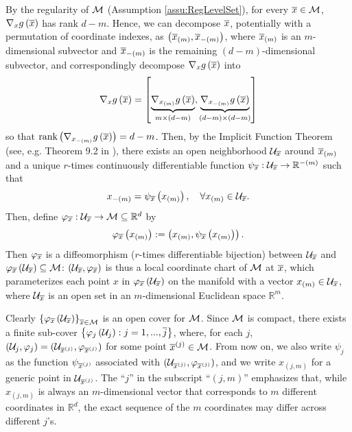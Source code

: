 \documentclass[12pt,american]{article}
\theoremstyle{definition}
\theoremstyle{plain}
\theoremstyle{definition}
\theoremstyle{plain}
\theoremstyle{plain}
\theoremstyle{plain}
\theoremstyle{plain}
\theoremstyle{plain}
\newcommand{\R}{\mathbb{R}}
\begin{document}
By the regularity of ${\cal M}$ (Assumption \ref{assu:RegLevelSet}),
for every $\overline{x}\in{\cal M}$, $\nabla_{x}g\left(\overline{x}\right)$ has
rank $d-m$. Hence, we can decompose $\overline{x}$, potentially with a
permutation of coordinate indexes, as $\left(\overline{x}_{\left(m\right)},\overline{x}_{-\left(m\right)}\right)$,
where $\overline{x}_{\left(m\right)}$ is an $m$-dimensional subvector and
$\overline{x}_{-\left(m\right)}$ is the remaining $\left(d-m\right)$-dimensional
subvector, and correspondingly decompose $\nabla_{x}g\left(\overline{x}\right)$
into
\[
\nabla_{x}g\left(\overline{x}\right)=\left[\underset{m\times\left(d-m\right)}{\underbrace{\nabla_{x_{\left(m\right)}}g\left(\overline{x}\right)}},\underset{\left(d-m\right)\times\left(d-m\right)}{\underbrace{\nabla_{x_{-\left(m\right)}}g\left(\overline{x}\right)}}\right]
\]
so that $\text{rank}\left(\nabla_{x_{-\left(m\right)}}g\left(\overline{x}\right)\right)=d-m$.
Then, by the Implicit Function Theorem (see, e.g. Theorem 9.2 in \citealp{munkres1991analysis}),
there exists an open neighborhood ${\cal U}_{\overline{x}}$ around $\overline{x}_{\left(m\right)}$
and a unique $r$-times continuously differentiable function $\psi_{\ol x}:{\cal U}_{\ol x}\to\R^{-\left(m\right)}$
such that
\[
x_{-\left(m\right)}=\psi_{\overline{x}}\left(x_{\left(m\right)}\right),\quad\forall x_{\left(m\right)}\in{\cal U}_{\overline{x}}.
\]
Then, define $\varphi_{\ol x}:{\cal U}_{\ol x}\to{\cal M}\subseteq\R^{d}$
by
\[
\varphi_{\overline{x}}\left(x_{\left(m\right)}\right):=\left(x_{\left(m\right)},\psi_{\overline{x}}\left(x_{\left(m\right)}\right)\right).
\]
Then $\varphi_{\overline{x}}$ is a diffeomorphism ($r$-times differentiable
bijection) between ${\cal U}_{\overline{x}}$ and $\varphi_{\overline{x}}\left({\cal U}_{\overline{x}}\right)\subseteq{\cal M}$:
$\left({\cal U}_{\overline{x}},\varphi_{\overline{x}}\right)$ is thus a local coordinate
chart of ${\cal M}$ at $\overline{x}$, which parameterizes each point $x$
in $\varphi_{\overline{x}}\left({\cal U}_{\overline{x}}\right)$ on the manifold
with a vector $x_{\left(m\right)} \in {\cal U}_{\overline{x}}$, where ${\cal U}_{\overline{x}}$ is
an open set in an $m$-dimensional Euclidean space $\R^m$.

Clearly $\left\{ \varphi_{\overline{x}}\left({\cal U}_{\overline{x}}\right)\right\} _{\overline{x}\in{\cal M}}$
is an open cover for ${\cal M}$. Since ${\cal M}$ is compact, there
exists a finite sub-cover $\left\{ \varphi_{j}\left({\cal U}_{j}\right):j=1,...,\overline{j}\right\} $,
where, for each $j$, $\left({\cal U}_{j},\varphi_{j}\right)=\left({\cal U}_{\overline{x}^{\left(j\right)}},\varphi_{\overline{x}^{\left(j\right)}}\right)$
for some point $\overline{x}^{\left(j\right)}\in{\cal M}$. From now on,
we also write $\psi_{j}$ as the function $\psi_{\overline{x}^{\left(j\right)}}$
associated with $\left({\cal U}_{\overline{x}^{\left(j\right)}},\varphi_{\overline{x}^{\left(j\right)}}\right)$,
and we write $x_{\left(j,m\right)}$ for a generic point in ${\cal U}_{\overline{x}^{\left(j\right)}}$.
The ``$j$'' in the subscript ``$\left(j,m\right)$'' emphasizes
that, while $x_{\left(j,m\right)}$ is always an $m$-dimensional
vector that corresponds to $m$ different coordinates in $\R^{d}$,
the exact sequence of the $m$ coordinates may differ across different
$j$'s.
\end{document}
